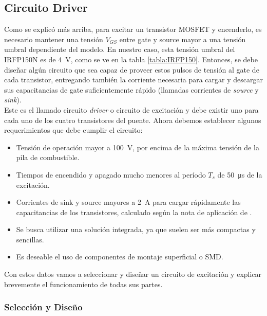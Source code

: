 \subsection{Circuito Driver}

Como se explicó más arriba, para excitar un transistor MOSFET y encenderlo, es necesario mantener una tensión $V_{GS}$ entre gate y source mayor a una tensión umbral dependiente del modelo. En nuestro caso, esta tensión umbral del IRFP150N es de \SI[]{4}[]{\volt}, como se ve en la tabla \ref{tabla:IRFP150}. Entonces, se debe diseñar algún circuito que sea capaz de proveer estos pulsos de tensión al gate de cada transistor, entregando también la corriente necesaria para cargar y descargar sus capacitancias de gate suficientemente rápido (llamadas corrientes de \textit{source} y \textit{sink}).\\

Este es el llamado {\Medium circuito \textit{driver}} o {\Medium circuito de excitación} y debe existir uno para cada uno de los cuatro transistores del puente. Ahora debemos establecer algunos requerimientos que debe cumplir el circuito:\\

\begin{itemize}
    \item Tensión de operación mayor a \SI[]{100}[]{\volt}, por encima de la máxima tensión de la pila de combustible.
    \item Tiempos de encendido y apagado mucho menores al período $T_s$ de \SI[]{50}[]{\micro\second} de la excitación.
    \item Corrientes de sink y source mayores a \SI[]{2}[]{\ampere} para cargar rápidamente las capacitancias de los transistores, calculado según la nota de aplicación de \cite{SinkSourceCurrent}.
    \item Se busca utilizar una solución integrada, ya que suelen ser más compactas y sencillas.
    \item Es deseable el uso de componentes de montaje superficial o SMD.\\
\end{itemize}

Con estos datos vamos a seleccionar y diseñar un circuito de excitación y explicar brevemente el funcionamiento de todas sus partes.\\

\subsubsection{Selección y Diseño}


